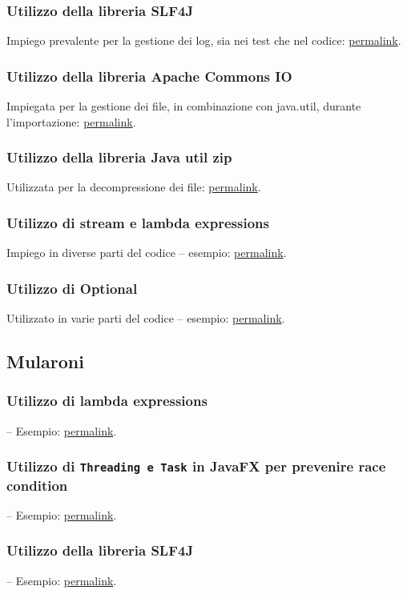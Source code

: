 \documentclass[a4paper,12pt]{report}
\begin{document}
\subsubsection{Utilizzo della libreria SLF4J}
Impiego prevalente per la gestione dei log, sia nei test che nel codice: \href{https://google.com}{permalink}.
\subsubsection{Utilizzo della libreria Apache Commons IO}
Impiegata per la gestione dei file, in combinazione con java.util, durante l'importazione: \href{https://google.com}{permalink}.
\subsubsection{Utilizzo della libreria Java util zip}
Utilizzata per la decompressione dei file: \href{https://google.com}{permalink}. 
\subsubsection{Utilizzo di stream e lambda expressions}
Impiego in diverse parti del codice – esempio: \href{https://google.com}{permalink}.
\subsubsection{Utilizzo di Optional}
Utilizzato in varie parti del codice – esempio: \href{https://google.com}{permalink}.

\subsection{Mularoni}
\subsubsection{Utilizzo di lambda expressions} – Esempio: \href{https://github.com/Matt2309/temple-tower/blob/297b37062035f41c3e9258656beace208905a368/src/main/java/it/unibo/templetower/controller/GameControllerImpl.java#L206}{permalink}.
\subsubsection{Utilizzo di \texttt{Threading e Task} in JavaFX per prevenire race condition} – Esempio: \href{https://github.com/Matt2309/temple-tower/blob/297b37062035f41c3e9258656beace208905a368/src/main/java/it/unibo/templetower/view/MainFloorView.java#L90}{permalink}.
\subsubsection{Utilizzo della libreria SLF4J} – Esempio: \href{https://github.com/Matt2309/temple-tower/blob/297b37062035f41c3e9258656beace208905a368/src/test/java/it/unibo/templetower/ControllerTest.java#L27}{permalink}.
\end{document}
